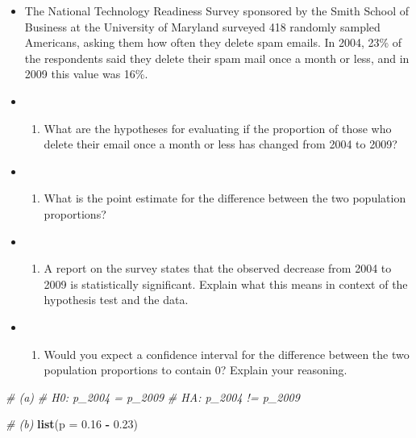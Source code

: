 \documentclass[]{book}
\newenvironment{Shaded}{\begin{snugshade}}{\end{snugshade}}
\newcommand{\CommentTok}[1]{\textcolor[rgb]{0.56,0.35,0.01}{\textit{#1}}}
\newcommand{\DataTypeTok}[1]{\textcolor[rgb]{0.13,0.29,0.53}{#1}}
\newcommand{\FloatTok}[1]{\textcolor[rgb]{0.00,0.00,0.81}{#1}}
\newcommand{\KeywordTok}[1]{\textcolor[rgb]{0.13,0.29,0.53}{\textbf{#1}}}
\newcommand{\NormalTok}[1]{#1}
\newcommand{\OperatorTok}[1]{\textcolor[rgb]{0.81,0.36,0.00}{\textbf{#1}}}
\newcommand{\StringTok}[1]{\textcolor[rgb]{0.31,0.60,0.02}{#1}}
\providecommand{\tightlist}{%
  \setlength{\itemsep}{0pt}\setlength{\parskip}{0pt}}
\begin{document}
\begin{itemize}
\item
  The National Technology Readiness Survey sponsored by the
  Smith School of Business at the University of Maryland surveyed 418 randomly sampled Americans,
  asking them how often they delete spam emails. In 2004, 23\% of the respondents said they delete
  their spam mail once a month or less, and in 2009 this value was 16\%.
\item
  \begin{enumerate}
  \def\labelenumi{(\alph{enumi})}
  \tightlist
  \item
    What are the hypotheses for evaluating if the proportion of those who delete their email once
    a month or less has changed from 2004 to 2009?
  \end{enumerate}
\item
  \begin{enumerate}
  \def\labelenumi{(\alph{enumi})}
  \setcounter{enumi}{1}
  \tightlist
  \item
    What is the point estimate for the difference between the two population proportions?
  \end{enumerate}
\item
  \begin{enumerate}
  \def\labelenumi{(\alph{enumi})}
  \setcounter{enumi}{2}
  \tightlist
  \item
    A report on the survey states that the observed decrease from 2004 to 2009 is statistically
    significant. Explain what this means in context of the hypothesis test and the data.
  \end{enumerate}
\item
  \begin{enumerate}
  \def\labelenumi{(\alph{enumi})}
  \setcounter{enumi}{3}
  \tightlist
  \item
    Would you expect a confidence interval for the difference between the two population proportions to contain 0? Explain your reasoning.
  \end{enumerate}
\end{itemize}

\begin{Shaded}
\begin{Highlighting}[]
\CommentTok{# (a)}
\CommentTok{# H0: p_2004 = p_2009}
\CommentTok{# HA: p_2004 != p_2009}
\end{Highlighting}
\end{Shaded}

\begin{Shaded}
\begin{Highlighting}[]
\CommentTok{# (b)}
\KeywordTok{list}\NormalTok{(}\DataTypeTok{p =} \FloatTok{0.16} \OperatorTok{-}\StringTok{ }\FloatTok{0.23}\NormalTok{)}
\end{Highlighting}
\end{Shaded}
\end{document}
